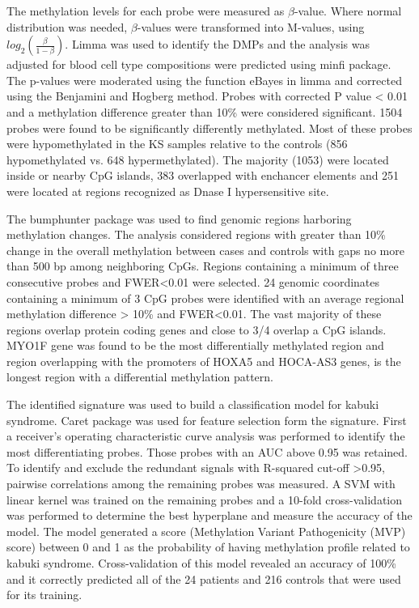 The methylation levels for each probe were measured as $\beta$-value. Where normal distribution was needed, $\beta$-values were transformed into M-values, using $log_2(\frac{\beta}{1-\beta})$. Limma was used to identify the DMPs and the analysis was adjusted for blood cell type compositions were predicted using minfi package. The p-values were moderated using the function eBayes in limma and corrected  using the Benjamini and Hogberg method. Probes with corrected P value < 0.01 and a methylation difference greater than 10\% were considered significant. 1504 probes were found to be significantly differently methylated. Most of these probes were hypomethylated in the KS samples relative to the controls (856 hypomethylated vs. 648 hypermethylated). The majority (1053) were located inside or nearby CpG islands, 383 overlapped with enchancer elements and 251 were located at regions recognized as Dnase I hypersensitive site.

The bumphunter package was used to find genomic regions harboring methylation changes. The analysis considered regions with greater than 10\% change in the overall methylation between cases and controls with gaps no more than 500 bp among neighboring CpGs. Regions containing a minimum of three consecutive probes and FWER<0.01 were selected. 24 genomic coordinates containing a minimum of 3 CpG probes were identified with an average regional methylation difference > 10\% and FWER<0.01. The vast majority of these regions overlap protein coding genes and close to 3/4 overlap a CpG islands. MYO1F gene was found to be the most differentially methylated region and region overlapping with the promoters of HOXA5 and HOCA-AS3 genes, is the longest region with a differential methylation pattern.

The identified signature was used to build a classification model for kabuki syndrome. Caret package was used for feature selection form the signature. First a receiver's operating characteristic curve analysis was performed to identify the most differentiating probes. Those probes with an AUC above 0.95 was retained. To identify and exclude the redundant signals with R-squared cut-off >0.95, pairwise correlations among the remaining probes was measured. A SVM with linear kernel was trained on the remaining probes and a 10-fold cross-validation was performed to determine the best hyperplane and measure the accuracy of the model. The model generated a score (Methylation Variant Pathogenicity (MVP) score) between 0 and 1 as the probability of having methylation profile related to kabuki syndrome. Cross-validation of this model revealed an accuracy of 100\% and it correctly predicted all of the 24 patients and 216 controls that were used for its training.

